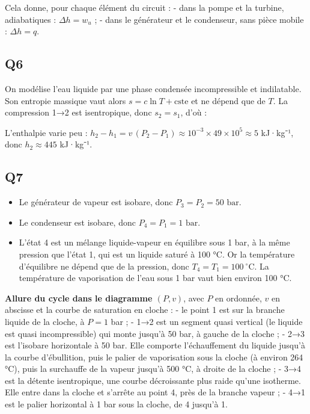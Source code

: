 \documentclass[11pt,a4paper]{article}
\providecommand{\tightlist}{\setlength{\itemsep}{0pt}\setlength{\parskip}{0pt}}
\newcommand{\equationajustee}[1]{%
  \sbox{\boiteequation}{$\displaystyle #1$}%
  \ifdim\wd\boiteequation>\linewidth
    \[\resizebox{\linewidth}{!}{\usebox{\boiteequation}}\]%
  \else
    \[#1\]%
  \fi}
\begin{document}
Cela donne, pour chaque élément du circuit :
- dans la pompe et la turbine, adiabatiques : \(\Delta h=w_u\) ;
- dans le générateur et le condenseur, sans pièce mobile : \(\Delta h=q\).

\hypertarget{q6}{%
\subsection{Q6}\label{q6}}

On modélise l'eau liquide par une phase condensée incompressible et indilatable. Son entropie massique vaut alors \(s=c\ln T+\text{cste}\) et ne dépend que de \(T\). La compression 1→2 est isentropique, donc \(s_2=s_1\), d'où :
\equationajustee{\boxed{T_2=T_1=100\ ^\circ\text{C}}}

L'enthalpie varie peu : \(h_2-h_1=v\,(P_2-P_1)\approx10^{-3}\times49\times10^5\approx5\) kJ·kg⁻¹, donc \(h_2\approx445\) kJ·kg⁻¹.

\hypertarget{q7}{%
\subsection{Q7}\label{q7}}

\begin{itemize}
\tightlist
\item
  Le générateur de vapeur est isobare, donc \(\boxed{P_3=P_2=50\text{ bar}}\).
\item
  Le condenseur est isobare, donc \(\boxed{P_4=P_1=1\text{ bar}}\).
\item
  L'état 4 est un mélange liquide-vapeur en équilibre sous 1 bar, à la même pression que l'état 1, qui est un liquide saturé à 100 °C. Or la température d'équilibre ne dépend que de la pression, donc \(\boxed{T_4=T_1=100\ ^\circ\text{C}}\). La température de vaporisation de l'eau sous 1 bar vaut bien environ 100 °C.
\end{itemize}

\textbf{Allure du cycle dans le diagramme \((P,v)\)}, avec \(P\) en ordonnée, \(v\) en abscisse et la courbe de saturation en cloche :
- le point 1 est sur la branche liquide de la cloche, à \(P=1\) bar ;
- 1→2 est un segment quasi vertical (le liquide est quasi incompressible) qui monte jusqu'à 50 bar, à gauche de la cloche ;
- 2→3 est l'isobare horizontale à 50 bar. Elle comporte l'échauffement du liquide jusqu'à la courbe d'ébullition, puis le palier de vaporisation sous la cloche (à environ 264 °C), puis la surchauffe de la vapeur jusqu'à 500 °C, à droite de la cloche ;
- 3→4 est la détente isentropique, une courbe décroissante plus raide qu'une isotherme. Elle entre dans la cloche et s'arrête au point 4, près de la branche vapeur ;
- 4→1 est le palier horizontal à 1 bar sous la cloche, de 4 jusqu'à 1.
\end{document}
